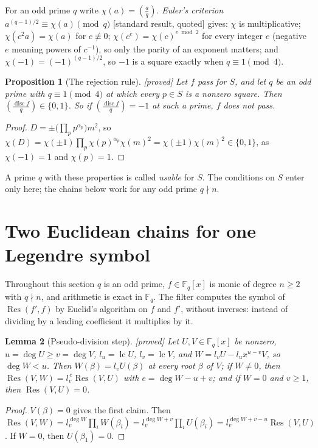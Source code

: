 \documentclass[10pt,a4paper]{article}
\newcommand{\Fq}{\mathbb{F}_q}
\DeclareMathOperator{\Res}{Res}
\DeclareMathOperator{\disc}{disc}
\DeclareMathOperator{\lc}{lc}
\newcommand{\leg}[2]{\left(\frac{#1}{#2}\right)}
\newcommand{\stproved}{\textsf{\small[proved]}\xspace}
\newcommand{\stquoted}{\textsf{\small[standard result, quoted]}\xspace}
\theoremstyle{plain}
\newtheorem{proposition}{Proposition}
\newtheorem{lemma}[proposition]{Lemma}
\theoremstyle{definition}
\begin{document}
For an odd prime $q$ write $\chi(a)=\leg aq$.  \emph{Euler's criterion} $a^{(q-1)/2}\equiv\chi(a)\pmod q$ \stquoted gives: $\chi$ is multiplicative;
$\chi(c^2a)=\chi(a)$ for $c\not\equiv0$; $\chi(c^e)=\chi(c)^{e\bmod2}$ for every integer $e$ (negative $e$ meaning powers of $c^{-1}$), so only the parity of an
exponent matters; and $\chi(-1)=(-1)^{(q-1)/2}$, so $-1$ is a square exactly when $q\equiv1\pmod4$.

\begin{proposition}[The rejection rule]\label{prop:rule}\stproved
Let $f$ pass for $S$, and let $q$ be an odd prime with $q\equiv1\pmod4$ at which every $p\in S$ is a nonzero square.  Then $\leg{\disc f}{q}\in\{0,1\}$.  So if
$\leg{\disc f}{q}=-1$ at such a prime, $f$ does not pass.
\end{proposition}
\begin{proof}
$D=\pm\bigl(\prod_pp^{\alpha_p}\bigr)m^2$, so $\chi(D)=\chi(\pm1)\prod_p\chi(p)^{\alpha_p}\chi(m)^2=\chi(\pm1)\chi(m)^2\in\{0,1\}$, as $\chi(-1)=1$ and $\chi(p)=1$.
\end{proof}

A prime $q$ with these properties is called \emph{usable} for $S$.  The conditions on $S$ enter only here; the chains below work for any odd prime $q\nmid n$.

\section{Two Euclidean chains for one Legendre symbol}\label{sec:chains}

Throughout this section $q$ is an odd prime, $f\in\Fq[x]$ is monic of degree $n\ge2$ with $q\nmid n$, and arithmetic is exact in $\Fq$.  The filter computes the
symbol of $\Res(f',f)$ by Euclid's algorithm on $f$ and $f'$, without inverses: instead of dividing by a leading coefficient it multiplies by it.

\begin{lemma}[Pseudo-division step]\label{lem:L1}\stproved
Let $U,V\in\Fq[x]$ be nonzero, $u=\deg U\ge v=\deg V$, $l_u=\lc U$, $l_v=\lc V$, and $W=l_vU-l_ux^{u-v}V$, so $\deg W<u$.  Then $W(\beta)=l_vU(\beta)$ at every
root $\beta$ of $V$; if $W\neq0$, then $\Res(V,W)=l_v^{\,e}\Res(V,U)$ with $e=\deg W-u+v$; and if $W=0$ and $v\ge1$, then $\Res(V,U)=0$.
\end{lemma}
\begin{proof}
$V(\beta)=0$ gives the first claim.  Then $\Res(V,W)=l_v^{\deg W}\prod_iW(\beta_i)=l_v^{\deg W+v}\prod_iU(\beta_i)=l_v^{\deg W+v-u}\Res(V,U)$.  If $W=0$, then
$U(\beta_1)=0$.
\end{proof}
\end{document}

